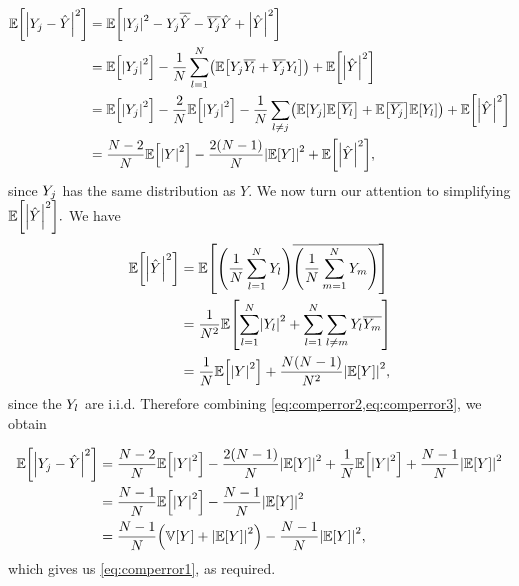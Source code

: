 \begin{align}
\EXP{\abs{\Yj-\Yhat}^2} &= \EXP{\abs{\Yj}^2 - \Yj \Yhatbar - \Yjbar \Yhat + \abs{\Yhat}^2}\nonumber\\
&= \EXP{\abs{\Yj}^2} - \frac1N\sum_{l=1}^N \mleft(\EXP{\Yj\Ylbar + \Yjbar \Yl}\mright) + \EXP{\abs{\Yhat}^2}\nonumber\\
&= \EXP{\abs{\Yj}^2} - \frac2N \EXP{\abs{\Yj}^2} - \frac1N \sum_{l \neq j} \mleft(\EXP{\Yj}\EXP{\Ylbar} + \EXP{\Yjbar}\EXP{\Yl}\mright) + \EXP{\abs{\Yhat}^2}\nonumber\\
&= \frac{N-2}N \EXP{\abs{Y}^2} - \frac{2(N-1)}N \abs{\EXP{Y}}^2 + \EXP{\abs{\Yhat}^2},\label{eq:comperror2}
  \end{align}
since  $Y_{j}$ has the same distribution as $Y$. We now turn our attention to simplifying $\EXP{\abs{\Yhat}^2}.$ We have
\begin{align}
\EXP{\abs{\Yhat}^2} &= \EXP{\mleft(\frac1N \sum_{l=1}^N \Yl\mright)\overline{\mleft(\frac1N \sum_{m=1}^N \Ym\mright)}}\nonumber\\
&= \frac1{N^2}\EXP{ \sum_{l=1}^N \abs{\Yl}^2 + \sum_{l=1}^N\sum_{l \neq m} \Yl\Ymbar}\nonumber\\
&= \frac1N \EXP{\abs{Y}^2} + \frac{N(N-1)}{N^2}\abs{\EXP{Y}}^2,\label{eq:comperror3}
\end{align}
since the  $Y_{l}$ are i.i.d. Therefore combining \cref{eq:comperror2,eq:comperror3}, we obtain

\begin{align*}
\EXP{\abs{\Yj-\Yhat}^2} &= \frac{N-2}N \EXP{\abs{Y}^2} - \frac{2(N-1)}N \abs{\EXP{Y}}^2 + \frac1N \EXP{\abs{Y}^2} + \frac{N-1}{N}\abs{\EXP{Y}}^2\\
&= \frac{N-1}N \EXP{\abs{Y}^2} - \frac{N-1}N \abs{\EXP{Y}}^2\\
&= \frac{N-1}N \mleft(\VAR{Y}+\abs{\EXP{Y}}^2\mright) - \frac{N-1}N \abs{\EXP{Y}}^2,
\end{align*}
which gives us \cref{eq:comperror1}, as required.
\epf

